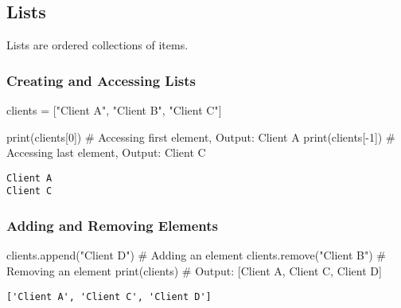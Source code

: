 \documentclass[
  letterpaper,
  DIV=11,
  numbers=noendperiod]{scrreprt}
\newenvironment{Shaded}{\begin{snugshade}}{\end{snugshade}}
\newcommand{\BuiltInTok}[1]{\textcolor[rgb]{0.00,0.23,0.31}{#1}}
\newcommand{\CommentTok}[1]{\textcolor[rgb]{0.37,0.37,0.37}{#1}}
\newcommand{\DecValTok}[1]{\textcolor[rgb]{0.68,0.00,0.00}{#1}}
\newcommand{\NormalTok}[1]{\textcolor[rgb]{0.00,0.23,0.31}{#1}}
\newcommand{\OperatorTok}[1]{\textcolor[rgb]{0.37,0.37,0.37}{#1}}
\newcommand{\StringTok}[1]{\textcolor[rgb]{0.13,0.47,0.30}{#1}}
\begin{document}
\subsection{Lists}\label{lists}

Lists are ordered collections of items.

\subsubsection{Creating and Accessing
Lists}\label{creating-and-accessing-lists}

\begin{Shaded}
\begin{Highlighting}[]
\NormalTok{clients }\OperatorTok{=}\NormalTok{ [}\StringTok{"Client A"}\NormalTok{, }\StringTok{"Client B"}\NormalTok{, }\StringTok{"Client C"}\NormalTok{]}

\BuiltInTok{print}\NormalTok{(clients[}\DecValTok{0}\NormalTok{])  }\CommentTok{\# Accessing first element, Output: Client A}
\BuiltInTok{print}\NormalTok{(clients[}\OperatorTok{{-}}\DecValTok{1}\NormalTok{]) }\CommentTok{\# Accessing last element, Output: Client C}
\end{Highlighting}
\end{Shaded}

\begin{verbatim}
Client A
Client C
\end{verbatim}

\subsubsection{Adding and Removing
Elements}\label{adding-and-removing-elements}

\begin{Shaded}
\begin{Highlighting}[]
\NormalTok{clients.append(}\StringTok{"Client D"}\NormalTok{)  }\CommentTok{\# Adding an element}
\NormalTok{clients.remove(}\StringTok{"Client B"}\NormalTok{)  }\CommentTok{\# Removing an element}
\BuiltInTok{print}\NormalTok{(clients)  }\CommentTok{\# Output: [\textquotesingle{}Client A\textquotesingle{}, \textquotesingle{}Client C\textquotesingle{}, \textquotesingle{}Client D\textquotesingle{}]}
\end{Highlighting}
\end{Shaded}

\begin{verbatim}
['Client A', 'Client C', 'Client D']
\end{verbatim}
\end{document}
